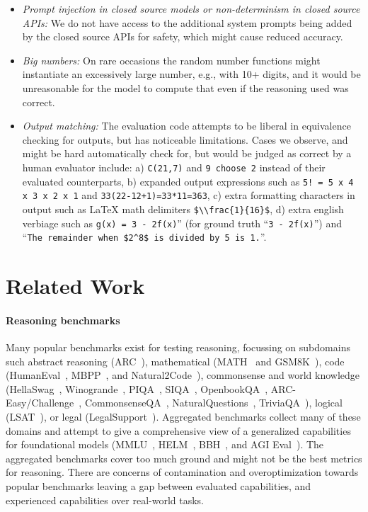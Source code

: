 \documentclass[11pt,a4paper]{article}
\begin{document}
\begin{itemize}
  \item {\em Prompt injection in closed source models or non-determinism in
    closed source APIs:} We do not have access to the additional system prompts being
    added by the closed source APIs for safety, which might cause reduced accuracy.

  \item {\em Big numbers:} On rare occasions the random number functions might
    instantiate an excessively large number, e.g., with 10+ digits, and it would be unreasonable for the model
    to compute that even if the reasoning used was correct.

  \item {\em Output matching:} The evaluation code attempts to be liberal in equivalence
    checking for outputs, but has noticeable limitations. Cases we observe, and
    might be hard automatically check for, but would be judged as correct by a
    human evaluator include: a) \verb|C(21,7)| and \verb|9 choose 2| instead of
    their evaluated counterparts, b) expanded output expressions such as
    \verb|5! = 5 x 4 x 3 x 2 x 1| and \verb|33(22-12+1)=33*11=363|, c)
    extra formatting characters in output such as LaTeX math delimiters
    \verb|$\\frac{1}{16}$|,
    d) extra english verbiage such as
    \verb|g(x) = 3 - 2f(x)|'' (for ground truth ``\verb|3 - 2f(x)|'') and\\
    ``\verb|The remainder when $2^8$ is divided by 5 is 1.|''.

\end{itemize}

\section{Related Work}

\paragraph{Reasoning benchmarks}
Many popular benchmarks exist for testing reasoning, focussing on subdomains
such
abstract reasoning (ARC~\cite{cholet-arc}),
mathematical (MATH~\cite{math} and GSM8K~\cite{gsm8k}),
code (HumanEval~\cite{humaneval}, MBPP~\cite{mbpp}, and Natural2Code~\cite{gemini}),
commonsense and world knowledge
(HellaSwag~\cite{hellaswag},
Winogrande~\cite{winogrande}, PIQA~\cite{piqa}, SIQA~\cite{siqa},
OpenbookQA~\cite{openbookqa}, ARC-Easy/Challenge~\cite{arc-easy-challenge},
CommonsenseQA~\cite{commonsenseQA},
NaturalQuestions~\cite{naturalquestions}, TriviaQA~\cite{triviaQA}),
logical (LSAT~\cite{lsat}),
or legal (LegalSupport~\cite{helm}).
Aggregated benchmarks collect many of these domains and attempt to give
a comprehensive view of a generalized capabilities for foundational models
(MMLU~\cite{mmlu},
HELM~\cite{helm}, BBH~\cite{big-bench-hard}, and AGI Eval~\cite{agi-eval}).
The aggregated benchmarks cover too much ground and might not be the best
metrics for reasoning.
There are concerns of contamination and overoptimization towards popular
benchmarks leaving a gap between evaluated capabilities, and experienced
capabilities over real-world tasks.
\end{document}
